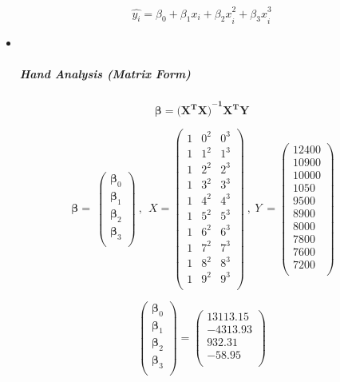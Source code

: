 \documentclass[
]{article}
\begin{document}
\[\widehat{y_{i}} = \beta_{0} + \beta_{1}x_{i} + {\beta_{2}x}_{i}^{2} + {\beta_{3}x}_{i}^{3}\]

\begin{itemize}
\item ~
  \hypertarget{hand-analysis-matrix-form-2}{%
  \subparagraph{\texorpdfstring{\textbf{Hand Analysis (Matrix
  Form)}}{Hand Analysis (Matrix Form)}}\label{hand-analysis-matrix-form-2}}
\end{itemize}

\[\mathbf{\beta =}{\mathbf{(}\mathbf{X}^{\mathbf{T}}\mathbf{X)}}^{\mathbf{- 1}}\mathbf{X}^{\mathbf{T}}\mathbf{Y}\]

\[\ \mathbf{\beta =}\ \begin{pmatrix}
\mathbf{\beta}_{0} \\
\mathbf{\beta}_{1} \\
\mathbf{\beta}_{2} \\
\mathbf{\beta}_{3} \\
\end{pmatrix}\ ,\ \ X = \begin{pmatrix}
1 & 0^{2} & 0^{3} \\
1 & 1^{2} & 1^{3} \\
1 & 2^{2} & 2^{3} \\
1 & 3^{2} & 3^{3} \\
1 & 4^{2} & 4^{3} \\
1 & 5^{2} & 5^{3} \\
1 & 6^{2} & 6^{3} \\
1 & 7^{2} & 7^{3} \\
1 & 8^{2} & 8^{3} \\
1 & 9^{2} & 9^{3} \\
\end{pmatrix}\ ,\ Y\  = \begin{pmatrix}
12400 \\
10900 \\
10000 \\
1050 \\
9500 \\
8900 \\
8000 \\
7800 \\
7600 \\
7200 \\
\end{pmatrix}\]

\[\begin{pmatrix}
\mathbf{\beta}_{0} \\
\mathbf{\beta}_{1} \\
\mathbf{\beta}_{2} \\
\mathbf{\beta}_{3} \\
\end{pmatrix} = \begin{pmatrix}
13113.15 \\
 - 4313.93 \\
932.31 \\
 - 58.95 \\
\end{pmatrix}\]
\end{document}

